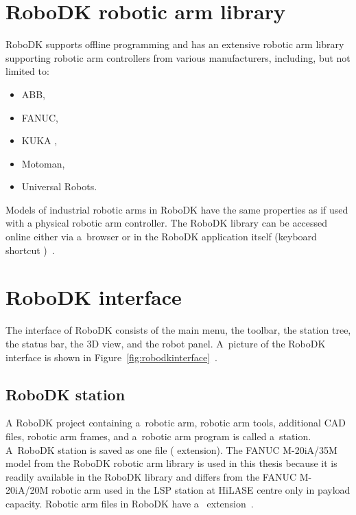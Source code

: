\section{RoboDK robotic arm library}

RoboDK supports offline programming and has an extensive robotic arm library supporting robotic arm controllers from various manufacturers, including, but not limited to:

\begin{itemize}
    \item ABB, 
    \item FANUC, 
    \item KUKA ,
    \item Motoman, 
    \item Universal Robots.
\end{itemize}
Models of industrial robotic arms in RoboDK have the same properties as if used with a physical robotic arm controller. The RoboDK library can be accessed online either via a~browser or in the RoboDK application itself (keyboard shortcut )~\cite{robodklibrary}.


\section{RoboDK interface}

The interface of RoboDK consists of the main menu, the toolbar, the station tree, the status bar, the 3D view, and the robot panel. A~picture of the RoboDK interface is shown in Figure~\ref{fig:robodkinterface}~\cite{robodkinterface}.

\subsection{RoboDK station}

A RoboDK project containing a~robotic arm, robotic arm tools, additional CAD files, robotic arm frames, and a~robotic arm program is called a~station. A~RoboDK station is saved as one file ( extension).  The FANUC M-20iA/35M model from the RoboDK robotic arm library is used in this thesis because it is readily available in the RoboDK library and differs from the FANUC M-20iA/20M robotic arm used in the LSP station at HiLASE centre only in payload capacity. Robotic arm files in RoboDK have a~ extension~\cite{robodkstation}.

